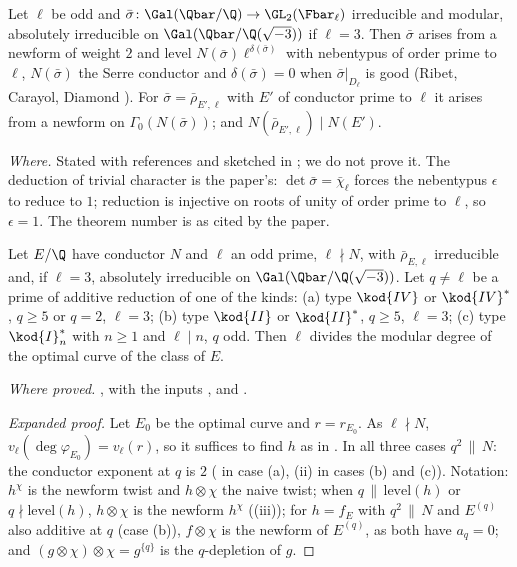 \begin{sloppypar}
\begin{theorem}\label{thm:paper:optimal-level}
Let $\ell$ be odd and $\bar\sigma\colon\Gal(\Qbar/\Q)\to\GL_2(\Fbar_\ell)$ irreducible and modular, absolutely irreducible on $\Gal(\Qbar/\Q(\sqrt{-3}))$ if $\ell=3$. Then $\bar\sigma$ arises from a
newform of weight $2$ and level $N(\bar\sigma)\ell^{\delta(\bar\sigma)}$ with nebentypus of order prime to $\ell$, $N(\bar\sigma)$ the Serre conductor and $\delta(\bar\sigma)=0$ when $\bar\sigma|_{D_\ell}$ is good
\cite[Theorem 3.15]{DDT} (Ribet, Carayol, Diamond \cite{Ribet90,Carayol89,Diamond95}). For $\bar\sigma=\bar\rho_{E',\ell}$ with $E'$ of conductor prime to $\ell$ it arises from a newform on
$\Gamma_0(N(\bar\sigma))$; and $N(\bar\rho_{E',\ell})\mid N(E')$.
\end{theorem}

\noindent\emph{Where.} Stated with references and sketched in ; we do not prove it. The deduction of trivial character is the paper's: $\det\bar\sigma=\bar\chi_\ell$ forces
the nebentypus $\epsilon$ to reduce to $1$; reduction is injective on roots of unity of order prime to $\ell$, so $\epsilon=1$. The theorem number is as cited by the paper.

\begin{theorem}\label{thm:paper:qual}
Let $E/\Q$ have conductor $N$ and $\ell$ an odd prime, $\ell\nmid N$, with $\bar\rho_{E,\ell}$ irreducible and, if $\ell=3$, absolutely irreducible on $\Gal(\Qbar/\Q(\sqrt{-3}))$. Let $q\ne\ell$ be a
prime of additive reduction of one of the kinds: (a) type $\kod{IV}$ or $\kod{IV}^*$, $q\ge5$ or $q=2$, $\ell=3$; (b) type $\kod{II}$ or $\kod{II}^*$, $q\ge5$, $\ell=3$; (c) type $\kod{I}_n^*$ with $n\ge1$ and $\ell\mid n$,
$q$ odd. Then $\ell$ divides the modular degree of the optimal curve of the class of $E$.
\end{theorem}

\noindent\emph{Where proved.} , with the inputs ,  and
\cite[Theorem 2.2]{ARS12}.

\begin{proof}[Expanded proof]
Let $E_0$ be the optimal curve and $r=r_{E_0}$. As $\ell\nmid N$, $v_\ell(\deg\varphi_{E_0})=v_\ell(r)$, so it suffices to find $h$ as in . In all three cases $q^2\,\|\,N$: the
conductor exponent at $q$ is $2$ ( in case (a), (ii) in cases (b) and (c)). Notation: $h^\chi$ is the newform twist and $h\otimes\chi$ the naive
twist; when $q\,\|\,\mathrm{level}(h)$ or $q\nmid\mathrm{level}(h)$, $h\otimes\chi$ is the newform $h^\chi$ ((iii)); for $h=f_E$ with $q^2\,\|\,N$ and $E^{(q)}$ also additive at $q$ (case (b)), $f\otimes\chi$ is the
newform of $E^{(q)}$, as both have $a_q=0$; and $(g\otimes\chi)\otimes\chi=g^{\{q\}}$ is the $q$-depletion of $g$.


\end{proof}
\end{sloppypar}
